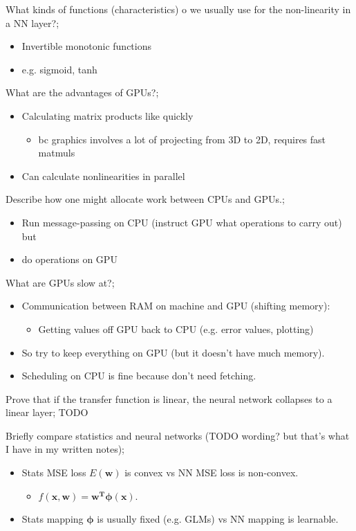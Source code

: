 \documentclass{article}
\begin{document}
What kinds of functions (characteristics) o we usually use for the non-linearity in a NN layer?; \begin{itemize}
    \item Invertible monotonic functions
    \item e.g. sigmoid, tanh
\end{itemize}

What are the advantages of GPUs?; \begin{itemize}
    \item Calculating matrix products like  quickly
    \begin{itemize}
        \item bc graphics involves a lot of projecting from 3D to 2D, requires fast matmuls
    \end{itemize}
    \item Can calculate nonlinearities in parallel
\end{itemize}

Describe how one might allocate work between CPUs and GPUs.; \begin{itemize}
    \item Run message-passing on CPU (instruct GPU what operations to carry out) but
    \item do operations on GPU
\end{itemize}

What are GPUs slow at?; \begin{itemize}
    \item Communication between RAM on machine and GPU (shifting memory): \begin{itemize}
        \item Getting values off GPU back to CPU (e.g. error values, plotting)
    \end{itemize}
    \item So try to keep everything on GPU (but it doesn't have much memory). \item Scheduling on CPU is fine because don't need fetching.
\end{itemize}

Prove that if the transfer function is linear, the neural network collapses to a linear layer; TODO

Briefly compare statistics and neural networks (TODO wording? but that's what I have in my written notes); \begin{itemize}
    \item Stats MSE loss $E(\mathbf{w})$ is convex vs NN MSE loss is non-convex.
    \begin{itemize}
        \item $f(\mathbf{x, w})=\mathbf{w^T\phi(x)}$.
    \end{itemize}
    \item Stats mapping $\mathbf{\phi}$ is usually fixed (e.g. GLMs) vs NN mapping is learnable.
\end{itemize}
\end{document}
